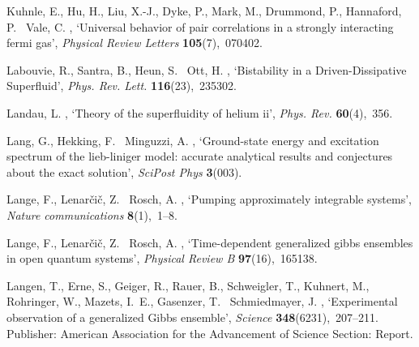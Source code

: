 \documentclass[onecolumn,amsfonts,showpacs,superscriptaddress]{revtex4-1}
\begin{document}
\begin{thebibliography}{xx}
Kuhnle, E., Hu, H., Liu, X.-J., Dyke, P., Mark, M., Drummond, P., Hannaford, P.
  \harvardand\ Vale, C.  \harvardyearright , `Universal
  behavior of pair correlations in a strongly interacting fermi gas', {\em
  Physical Review Letters} {\bf 105}(7),~070402.

Labouvie, R., Santra, B., Heun, S. \harvardand\ Ott, H.  \harvardyearleft
  2016\harvardyearright , `Bistability in a {Driven}-{Dissipative}
  {Superfluid}', {\em Phys. Rev. Lett.} {\bf 116}(23),~235302.

Landau, L.  \harvardyearright , `Theory of the
  superfluidity of helium ii', {\em Phys. Rev.} {\bf 60}(4),~356.

Lang, G., Hekking, F. \harvardand\ Minguzzi, A.  \harvardyearleft
  2017\harvardyearright , `Ground-state energy and excitation spectrum of the
  lieb-liniger model: accurate analytical results and conjectures about the
  exact solution', {\em SciPost Phys} {\bf 3}(003).

Lange, F., Lenar{\v{c}}i{\v{c}}, Z. \harvardand\ Rosch, A.  \harvardyearleft
  2017\harvardyearright , `Pumping approximately integrable systems', {\em
  Nature communications} {\bf 8}(1),~1--8.

Lange, F., Lenar{\v{c}}i{\v{c}}, Z. \harvardand\ Rosch, A.  \harvardyearright , `Time-dependent generalized gibbs ensembles in open
  quantum systems', {\em Physical Review B} {\bf 97}(16),~165138.

Langen, T., Erne, S., Geiger, R., Rauer, B., Schweigler, T., Kuhnert, M.,
  Rohringer, W., Mazets, I.~E., Gasenzer, T. \harvardand\ Schmiedmayer, J.
  \harvardyearleft 2015\harvardyearright , `Experimental observation of a
  generalized {Gibbs} ensemble', {\em Science} {\bf 348}(6231),~207--211.
\newblock Publisher: American Association for the Advancement of Science
  Section: Report.


\end{thebibliography}
\end{document}
